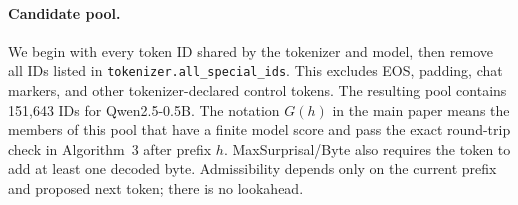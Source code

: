 \paragraph{Candidate pool.}
We begin with every token ID shared by the tokenizer and model, then remove all
IDs listed in \texttt{tokenizer.all\_special\_ids}. This excludes EOS, padding,
chat markers, and other tokenizer-declared control tokens. The resulting pool
contains 151,643 IDs for Qwen2.5-0.5B. The notation $G(h)$ in the main paper
means the members of this pool that have a finite model score and pass the
exact round-trip check in Algorithm~3 after prefix $h$. MaxSurprisal/Byte also
requires the token to add at least one decoded byte. Admissibility depends only
on the current prefix and proposed next token; there is no lookahead.

\begin{center}
\end{center}

